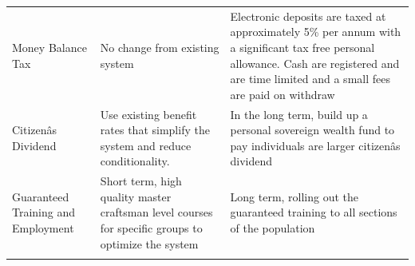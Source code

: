 \documentclass[]{tufte-handout}
\begin{document}
\begin{longtable}[]{@{}lll@{}}
\begin{minipage}[t]{0.20\columnwidth}
Money Balance Tax\strut
\end{minipage} & \begin{minipage}[t]{0.36\columnwidth}\raggedright
No change from existing system\strut
\end{minipage} & \begin{minipage}[t]{0.36\columnwidth}\raggedright
Electronic deposits are taxed at approximately 5\% per annum with a
significant tax free personal allowance. Cash are registered and are
time limited and a small fees are paid on withdraw\strut
\end{minipage}\tabularnewline
\begin{minipage}[t]{0.20\columnwidth}\raggedright
Citizenâs Dividend\strut
\end{minipage} & \begin{minipage}[t]{0.36\columnwidth}\raggedright
Use existing benefit rates that simplify the system and reduce
conditionality.\strut
\end{minipage} & \begin{minipage}[t]{0.36\columnwidth}\raggedright
In the long term, build up a personal sovereign wealth fund to pay
individuals are larger citizenâs dividend\strut
\end{minipage}\tabularnewline
\begin{minipage}[t]{0.20\columnwidth}\raggedright
Guaranteed Training and Employment\strut
\end{minipage} & \begin{minipage}[t]{0.36\columnwidth}\raggedright
Short term, high quality master craftsman level courses for specific
groups to optimize the system\strut
\end{minipage} & \begin{minipage}[t]{0.36\columnwidth}\raggedright
Long term, rolling out the guaranteed training to all sections of the
population\strut
\end{minipage}\tabularnewline
\begin{minipage}[t]{0.20\columnwidth}\raggedright
\strut
\end{minipage} & \begin{minipage}[t]{0.36\columnwidth}\raggedright
\strut
\end{minipage} & \begin{minipage}[t]{0.36\columnwidth}\raggedright
\strut
\end{minipage}\tabularnewline
\bottomrule
\end{longtable}

\newpage
\end{document}
